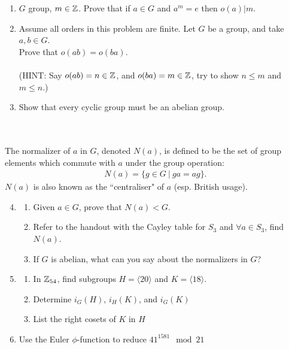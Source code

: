 \begin{enumerate}
    \item $G$ group, $m\in {\mathbb{ Z}}$. Prove that if $a\in G$ and $a^m=e$ then $o(a)|m$. \\ \steezybreak
    
    \item Assume all orders in this problem are finite. Let $G$ be a group, and take $a,b\in G$. \\Prove that $o(ab)=o(ba)$.\\ \\
    (HINT: Say $o(ab)=n\in {\mathbb{ Z}}$, and $o(ba)=m\in {\mathbb{ Z}}$, try to show $n\leq m$ and $m\leq n$.) \\ \steezybreak

    \item Show that every cyclic group must be an abelian group. \\ \\ 
\end{enumerate}
    
\begin{definition}\hspace{0.1in} \\
The normalizer of $a$ in $G$, denoted $N(a)$, is defined to be the set of group elements which commute with $a$ under the group operation:
\begin{align}
    N(a)=\{g\in G \ | \ ga=ag\}. \nonumber
\end{align}
$N(a)$ is also known as the ``centraliser" of $a$ (esp. British usage).
\end{definition}
\vspace{0.1in}
\begin{enumerate}
\setcounter{enumi}{3}
    \item \begin{enumerate}[label=\alph*)]
        \item Given $a\in G$, prove that $N(a)<G$.
        \item Refer to the handout with the Cayley table for $S_3$ and $\forall a \in S_3$, find $N(a)$.
        \item If $G$ is abelian, what can you say about the normalizers in $G$? \\ \steezybreak
        
    \end{enumerate}
    \item \begin{enumerate}[label=\alph*)]
        \item In ${\mathbb{ Z}}_{54}$, find subgroups $H=\langle 20 \rangle$ and $K= \langle 18 \rangle$.
        \item Determine $i_G(H)$, $i_H(K)$, and $i_G(K)$
        \item List the right cosets of $K$ in $H$ \\ \steezybreak
    \end{enumerate}
    \item Use the Euler $\phi$-function to reduce $41^{1581}\mod 21$
\end{enumerate}
\newpage
